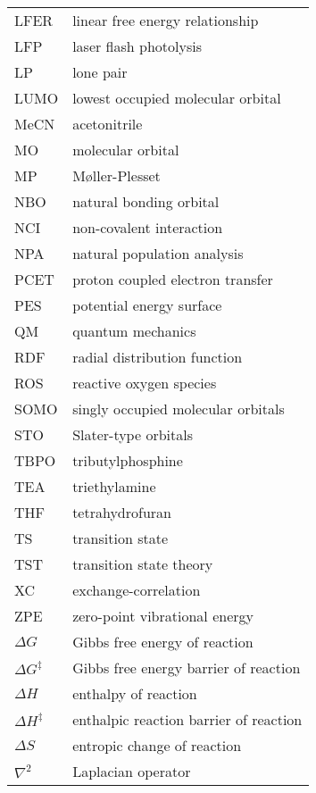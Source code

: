 \begin{longtable}{m{3cm} l}
  LFER & linear free energy relationship \\
  LFP & laser flash photolysis \\
  LP & lone pair \\
  LUMO & lowest occupied molecular orbital \\
  MeCN & acetonitrile \\
  MO & molecular orbital \\
  MP & M{\o}ller-Plesset \\
  NBO & natural bonding orbital \\
  NCI & non-covalent interaction \\
  NPA & natural population analysis \\
  PCET & proton coupled electron transfer \\
  PES & potential energy surface \\
  QM & quantum mechanics \\
  RDF & radial distribution function \\
  ROS & reactive oxygen species \\
  SOMO & singly occupied molecular orbitals \\
  STO & Slater-type orbitals \\
  TBPO & tributylphosphine \\
  TEA & triethylamine \\
  THF & tetrahydrofuran \\
  TS & transition state \\
  TST & transition state theory \\
  XC & exchange-correlation \\
  ZPE & zero-point vibrational energy \\
  $\Delta G$ & Gibbs free energy of reaction  \\
  $\Delta G^{\ddagger}$ & Gibbs free energy barrier of reaction  \\
  $\Delta H$ & enthalpy of reaction  \\
  $\Delta H^{\ddagger}$ & enthalpic reaction barrier of reaction  \\
  $\Delta S$ & entropic change of reaction  \\
  $\nabla^2$ & Laplacian operator  \\
\end{longtable}
\ResumeSuspendedCounters
